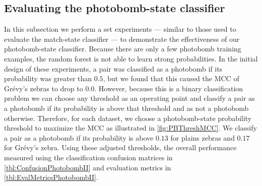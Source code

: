         \PairFailPN{}

        \PairFailNP{}

        \PairFailIN{} 

        \MatchLabelErrors{}

        \FloatBarrier{}


    \FloatBarrier{}
    \subsection{Evaluating the photobomb-state classifier}

        In this subsection we perform a set experiments --- similar to those used to evaluate the match-state
          classifier --- to demonstrate the effectiveness of our photobomb-state classifier.
        Because there are only a few photobomb training examples, the random forest is not able to learn strong
          probabilities.
        In the initial design of these experiments, a pair was classified as a photobomb if its probability was
          greater than $0.5$, but we found that this caused the MCC of Grévy's zebras to drop to $0.0$.
        However, because this is a binary classification problem we can choose any threshold as an operating
          point and classify a pair as a photobomb if its probability is above that threshold and as not a
          photobomb otherwise.
        Therefore, for each dataset, we choose a photobomb-state probability threshold to maximize the MCC as
          illustrated in \cref{fig:PBThreshMCC}.
        We classify a pair as a photobomb if its probability is above $0.13$ for plains zebras and $0.17$ for
          Grévy's zebra.
        Using these adjusted thresholds, the overall performance measured using the classification confusion
          matrices in \cref{tbl:ConfusionPhotobombII} and evaluation metrics in \cref{tbl:EvalMetricsPhotobombII}.


        \PBThreshMCC{}

        \ConfusionPhotobombII{}
        \EvalMetricsPhotobombII{}


